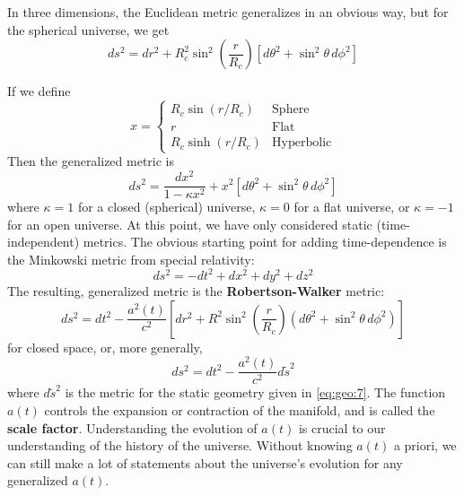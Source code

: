 \documentclass[10pt]{article}
\numberwithin{equation}{section}
\newcommand{\n}{\noindent}
\begin{document}
	\n In three dimensions, the Euclidean metric generalizes in an obvious way, but for the spherical universe, we get
	\begin{equation}
		\label{eq:geo:5} ds^2 = dr^2 + R_c^2\sin^2\left(\frac{r}{R_c}\right)\left[d\theta^2 + \sin^2\theta\,d\phi^2\right]
	\end{equation}
	
	\n If we define
	\begin{equation}
		\label{eq:geo:6} x = \left\{\begin{matrix}
			R_c\sin(r/R_c) & \mathrm{Sphere}\\
			r & \mathrm{Flat}\\
			R_c\sinh(r/R_c) & \mathrm{Hyperbolic}
		\end{matrix}\right.
	\end{equation}
	Then the generalized metric is
	\begin{equation}
		\label{eq:geo:7} ds^2 = \frac{dx^2}{1-\kappa x^2} + x^2\left[d\theta^2+\sin^2\theta\,d\phi^2\right]
	\end{equation}
	where $\kappa=1$ for a closed (spherical) universe, $\kappa=0$ for a flat universe, or $\kappa=-1$ for an open universe. At this point, we have only considered static (time-independent) metrics. The obvious starting point for adding time-dependence is the Minkowski metric from special relativity:
	\begin{equation}
		\label{eq:geo:8} ds^2 = -dt^2 + dx^2 + dy^2 + dz^2
	\end{equation}
	The resulting, generalized metric is the \textbf{Robertson-Walker} metric:
	\begin{equation}
		\label{eq:geo:9} ds^2 = dt^2 - \frac{a^2(t)}{c^2}\left[dr^2 + R^2\sin^2\left(\frac{r}{R_c}\right)\left(d\theta^2+\sin^2\theta\,d\phi^2\right)\right]
	\end{equation}
	for closed space, or, more generally,
	\begin{equation}
		\label{eq:geo:10} ds^2 = dt^2-\frac{a^2(t)}{c^2}d\tilde{s}^2
	\end{equation}
	where $d\tilde{s}^2$ is the metric for the static geometry given in \eqref{eq:geo:7}. The function $a(t)$ controls the expansion or contraction of the manifold, and is called the \textbf{scale factor}. Understanding the evolution of $a(t)$ is crucial to our understanding of the history of the universe. Without knowing $a(t)$ a priori, we can still make a lot of statements about the universe's evolution for any generalized $a(t)$.\\
	
\end{document}
